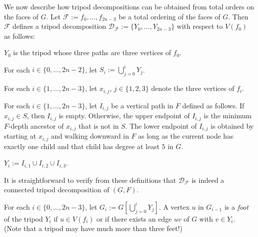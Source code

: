 \documentclass{patmorin}
\begin{document}
We now describe how tripod decompositions can be obtained from total orders on the faces of $G$.  Let $\mathcal{F}:=f_0,\ldots,f_{2n-3}$ be a total ordering of the faces of $G$.  Then $\mathcal{F}$ defines a tripod decomposition $\mathcal{D}_\mathcal{F}:=\{Y_0,\ldots,Y_{2n-3}\}$ with respect to $V(f_0)$ as follows:
\begin{compactenum}
  \item $Y_0$ is the tripod whose three paths are three vertices of $f_0$.
  \item For each $i\in\{0,\ldots,2n-2\}$, let $S_i:=\bigcup_{j=0}^i Y_j$.
  \item For each $i\in\{1,\ldots,2n-3\}$, let $x_{i,j}$, $j\in\{1,2,3\}$ denote the three vertices of $f_i$.
  \item For each $i\in\{1,\ldots,2n-3\}$, let $I_{i,j}$ be a vertical path in $F$ defined as follows.  If $x_{i,j}\in S$, then $I_{i,j}$ is empty.  Otherwise, the upper endpoint of $I_{i,j}$ is the minimum $F$-depth ancestor of $x_{i,j}$ that is not in $S$. The lower endpoint of $I_{i,j}$ is obtained by starting at $x_{i,j}$ and walking downward in $F$ as long as the current node has exactly one child and that child has degree at least $5$ in $G$.
  \item $Y_i:=I_{i,1}\cup I_{i,2}\cup I_{i,3}$.
\end{compactenum}
It is straightforward to verify from these definitions that $\mathcal{D}_\mathcal{F}$ is indeed a connected tripod decomposition of $(G,F)$.

For each $i\in\{0,\ldots,2n-3\}$, let $G_i:=G[\bigcup_{j=0}^iY_j]$.  A vertex $u$ in $G_{i-1}$ is a \emph{foot} of the tripod $Y_i$ if $u\in V(f_i)$ or if there exists an edge $uv$ of $G$ with $v\in Y_i$.  (Note that a tripod may have much more than three feet!)



\end{document}
